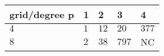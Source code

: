 \begin{tabular}{lllll}
\hline
 grid/degree p   & 1   & 2    & 3     & 4     \\
\hline
 $4$             & $1$ & $12$ & $20$  & $377$ \\
 $8$             & $2$ & $38$ & $797$ & NC    \\
\hline
\end{tabular}